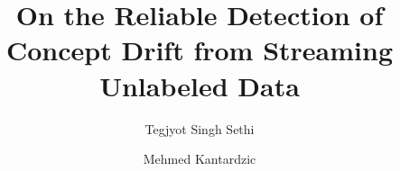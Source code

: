 \documentclass[authoryear,3p,times,twocolumn]{elsarticle}
\begin{document}
\begin{frontmatter}



\title{On the Reliable Detection of Concept Drift from Streaming Unlabeled Data}



\author[tj]{Tegjyot Singh Sethi }
\author[tj]{Mehmed Kantardzic}


\address[tj]{Data Mining Lab, University of Louisville, Louisville, USA }


\begin{abstract}


\end{abstract}
\end{frontmatter}
\end{document}

